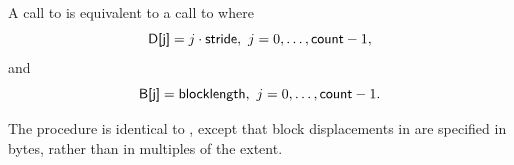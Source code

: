 A call to  is equivalent to a call to
 where
\begin{displaymath}
\mpiarg{D[j]} = j \cdot \mpiarg{stride},\ j=0 ,\ldots, \mpicode{count} -1 ,
\end{displaymath}
and
\begin{displaymath}
\mpiarg{B[j]} = \mpiarg{blocklength},\ j=0 ,\ldots, \mpicode{count} -1 .
\end{displaymath}

The procedure
is identical to
, except that block displacements in
 are specified in
bytes, rather than in multiples of the  extent.

